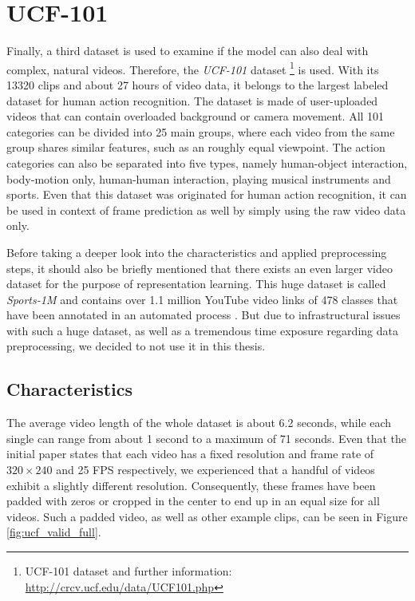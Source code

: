 \section{UCF-101} \label{sec:ds_ucf}

Finally, a third dataset is used to examine if the model can also deal with complex, natural videos. Therefore, the \textit{UCF-101} dataset \parencite{ucf}\footnote{UCF-101 dataset and further information: \url{http://crcv.ucf.edu/data/UCF101.php}} is used. With its \num{13320} clips and about \num{27} hours of video data, it belongs to the largest labeled dataset for human action recognition. The dataset is made of user-uploaded videos that can contain overloaded background or camera movement. All \num{101} categories can be divided into \num{25} main groups,  where each video from the same group shares similar features, such as an roughly equal viewpoint. The action categories can also be separated into five types, namely human-object interaction, body-motion only, human-human interaction, playing musical instruments and sports. Even that this dataset was originated for human action recognition, it can be used in context of frame prediction as well by simply using the raw video data only.

Before taking a deeper look into the characteristics and applied preprocessing steps, it should also be briefly mentioned that there exists an even larger video dataset for the purpose of representation learning. This huge dataset is called \textit{Sports-1M} and contains over \num{1.1} million YouTube video links of \num{478} classes that have been annotated in an automated process \parencite{large_video_class}. But due to infrastructural issues with such a huge dataset, as well as a tremendous time exposure regarding data preprocessing, we decided to not use it in this thesis.


\subsection{Characteristics}

The average video length of the whole dataset is about \num{6.2} seconds, while each single can range from about \num{1} second to a maximum of \num{71} seconds. Even that the initial paper states that each video has a fixed resolution and frame rate of $ 320 \times 240 $ and \num{25} FPS respectively, we experienced that a handful of videos exhibit a slightly different resolution. Consequently, these frames have been padded with zeros or cropped in the center to end up in an equal size for all videos. Such a padded video, as well as other example clips, can be seen in Figure \ref{fig:ucf_valid_full}.


